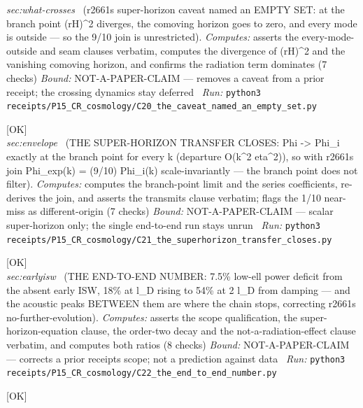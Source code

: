 \begin{description}
\textit{sec:what-crosses} \ (r2661s super-horizon caveat named an EMPTY SET: at the branch point (rH)\textasciicircum{}2 diverges, the comoving horizon goes to zero, and every mode is outside --- so the 9/10 join is unrestricted). 
\emph{Computes:} asserts the every-mode-outside and seam clauses verbatim, computes the divergence of (rH)\textasciicircum{}2 and the vanishing comoving horizon, and confirms the radiation term dominates (7 checks)
 \emph{Bound:} NOT-A-PAPER-CLAIM --- removes a caveat from a prior receipt; the crossing dynamics stay deferred
\ \emph{Run:} \texttt{python3 receipts/P15\_CR\_cosmology/C20\_the\_caveat\_named\_an\_empty\_set.py}
\item[\label{rcpt:C21_the_superhorizon_transfer_closes}\texttt{C21\_the\_superhorizon\_transfer\_closes}]\hfill\textsf{[OK]}\\
\textit{sec:envelope} \ (THE SUPER-HORIZON TRANSFER CLOSES: Phi -> Phi\_i exactly at the branch point for every k (departure O(k\textasciicircum{}2 eta\textasciicircum{}2)), so with r2661s join Phi\_exp(k) = (9/10) Phi\_i(k) scale-invariantly --- the branch point does not filter). 
\emph{Computes:} computes the branch-point limit and the series coefficients, re-derives the join, and asserts the transmits clause verbatim; flags the 1/10 near-miss as different-origin (7 checks)
 \emph{Bound:} NOT-A-PAPER-CLAIM --- scalar super-horizon only; the single end-to-end run stays unrun
\ \emph{Run:} \texttt{python3 receipts/P15\_CR\_cosmology/C21\_the\_superhorizon\_transfer\_closes.py}
\item[\label{rcpt:C22_the_end_to_end_number}\texttt{C22\_the\_end\_to\_end\_number}]\hfill\textsf{[OK]}\\
\textit{sec:earlyisw} \ (THE END-TO-END NUMBER: 7.5\% low-ell power deficit from the absent early ISW, 18\% at l\_D rising to 54\% at 2 l\_D from damping --- and the acoustic peaks BETWEEN them are where the chain stops, correcting r2661s no-further-evolution). 
\emph{Computes:} asserts the scope qualification, the super-horizon-equation clause, the order-two decay and the not-a-radiation-effect clause verbatim, and computes both ratios (8 checks)
 \emph{Bound:} NOT-A-PAPER-CLAIM --- corrects a prior receipts scope; not a prediction against data
\ \emph{Run:} \texttt{python3 receipts/P15\_CR\_cosmology/C22\_the\_end\_to\_end\_number.py}
\item[\label{rcpt:C59_the_control_reproduces_camb_and_the_height_defect_was_k_truncation}\texttt{C59\_the\_control\_reproduces\_camb\_and\_the\_height\_defect\_was\_k\_truncation}]\hfill\textsf{[OK]}\\

\end{description}
